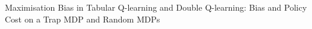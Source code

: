 Maximisation Bias in Tabular Q-learning and Double Q-learning: Bias and Policy Cost on a Trap MDP and Random MDPs
